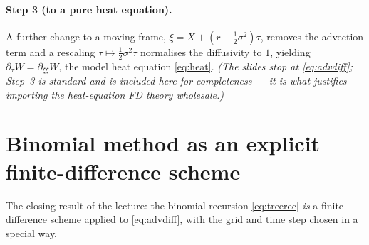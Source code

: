 \documentclass[11pt]{article}
\begin{document}
\paragraph{Step 3 (to a pure heat equation).} A further change to a moving frame, $\xi = X + (r-\tfrac12\sigma^2)\tau$, removes the advection term and a rescaling $\tau\mapsto \tfrac12\sigma^2\tau$ normalises the diffusivity to $1$, yielding $\partial_\tau W = \partial_{\xi\xi}W$, the model heat equation \eqref{eq:heat}. \emph{(The slides stop at \eqref{eq:advdiff}; Step~3 is standard and is included here for completeness --- it is what justifies importing the heat-equation FD theory wholesale.)}

\section{Binomial method as an explicit finite-difference scheme}
The closing result of the lecture: the binomial recursion \eqref{eq:treerec} \emph{is} a finite-difference scheme applied to \eqref{eq:advdiff}, with the grid and time step chosen in a special way.
\end{document}
